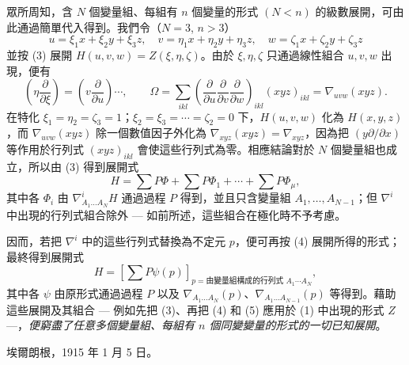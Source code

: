 \documentclass[11pt]{article}
\begin{document}
眾所周知，含 $N$ 個變量組、每組有 $n$ 個變量的形式 $(N<n)$ 的級數展開，可由此通過簡單代入得到。我們令（$N=3$, $n>3$）
\[
  u=\xi_1x+\xi_2y+\xi_3z,
  \quad v=\eta_1x+\eta_2y+\eta_3z,
  \quad w=\zeta_1x+\zeta_2y+\zeta_3z
\]
並按 (3) 展開 $H(u,v,w)=Z(\xi,\eta,\zeta)$。由於 $\xi,\eta,\zeta$ 只通過線性組合 $u,v,w$ 出現，便有
\[
  \left(\eta\frac{\partial}{\partial \xi}\right)=
  \left(v\frac{\partial}{\partial u}\right)\cdots,
  \qquad
  \Omega=\sum_{ikl}\left(\frac{\partial}{\partial u}
  \frac{\partial}{\partial v}
  \frac{\partial}{\partial w}\right)_{ikl}(xyz)_{ikl}
  =\nabla_{uvw}(xyz).
\]
在特化 $\xi_1=\eta_2=\zeta_3=1$；$\xi_2=\xi_3=\cdots=\zeta_2=0$ 下，$H(u,v,w)$ 化為 $H(x,y,z)$，而 $\nabla_{uvw}(xyz)$ 除一個數值因子外化為 $\nabla_{xyz}(xyz)=\nabla_{xyz}$，因為把 $(y\partial/\partial x)$ 等作用於行列式 $(xyz)_{ikl}$ 會使這些行列式為零。相應結論對於 $N$ 個變量組也成立，所以由 (3) 得到展開式
\begin{equation}
  H=\sum P\Phi+\sum P\Phi_1+\cdots+\sum P\Phi_\mu,
\tag{4}
\end{equation}
其中各 $\Phi_i$ 由 $\nabla^i_{A_1\ldots A_N}H$ 通過過程 $P$ 得到，並且只含變量組 $A_1,
\ldots,A_{N-1}$；但 $\nabla^i$ 中出現的行列式組合除外 --- 如前所述，這些組合在極化時不予考慮。

因而，若把 $\nabla^i$ 中的這些行列式替換為不定元 $p$，便可再按 (4) 展開所得的形式；最終得到展開式
\begin{equation}
  H=\left[\sum P\psi(p)\right]_{p=\text{由變量組構成的行列式 }A_1\cdots A_N},
\tag{5}
\end{equation}
其中各 $\psi$ 由原形式通過過程 $P$ 以及 $\nabla_{A_1\ldots A_N}(p)$、$\nabla_{A_1\ldots A_{N-1}}(p)$ 等得到。藉助這些展開及其組合 --- 例如先把 (3)、再把 (4) 和 (5) 應用於 (1) 中出現的形式 $Z$ ---，\emph{便窮盡了任意多個變量組、每組有 $n$ 個同變變量的形式的一切已知展開}。

埃爾朗根，1915 年 1 月 5 日。



\clearpage
\setcounter{footnote}{0}
\end{document}
